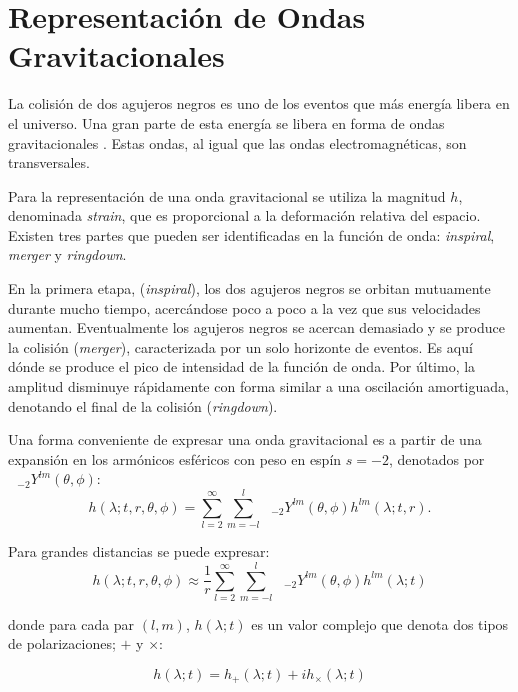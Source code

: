 \section{Representación de Ondas Gravitacionales}

La colisión de dos agujeros negros es uno de los eventos que más energía libera en el universo. Una gran parte de esta energía se libera en forma de ondas gravitacionales \cite{Centrella_2010}. Estas ondas, al igual que las ondas electromagnéticas, son transversales.

Para la representación de una onda gravitacional se utiliza la magnitud $h$, denominada \textit{strain}, que es proporcional a la deformación relativa del espacio. Existen tres partes que pueden ser identificadas en la función de onda: \textit{inspiral}, \textit{merger} y \textit{ringdown}. 

En la primera etapa, (\textit{inspiral}), los dos agujeros negros se orbitan mutuamente durante mucho tiempo, acercándose poco a poco a la vez que sus velocidades aumentan. Eventualmente los agujeros negros se acercan demasiado y se produce la colisión (\textit{merger}), caracterizada por un solo horizonte de eventos. Es aquí dónde se produce el pico de intensidad de la función de onda. Por último, la amplitud disminuye rápidamente con forma similar a una oscilación amortiguada, denotando el final de la colisión (\textit{ringdown}).

Una forma conveniente de expresar una onda gravitacional es a partir de una expansión en los armónicos esféricos con peso en espín $s=-2$, denotados por $\text{ }_{-2} Y^{lm} (\theta, \phi)$:
\begin{equation}
h( \lambda; t, r, \theta , \phi) =  \sum_{l=2}^{\infty}  \sum_{m=-l}^{l} \text{ }_{-2} Y^{lm} (\theta, \phi) h^{lm}(\lambda; t, r).
\end{equation}


Para grandes distancias se puede expresar:
\begin{equation}
h( \lambda; t, r, \theta , \phi) \approx \frac{1}{r}  \sum_{l=2}^{\infty}  \sum_{m=-l}^{l} \text{ }_{-2} Y^{lm} (\theta, \phi) h^{lm}(\lambda; t)
\end{equation}

donde para cada par $(l, m)$, $h(\lambda; t)$ es un valor complejo que denota dos tipos de polarizaciones; $+$ y $\times$:

\begin{equation}
h(\lambda; t) = h_{+}(\lambda; t) + i h_{\times}(\lambda; t)
\end{equation}

